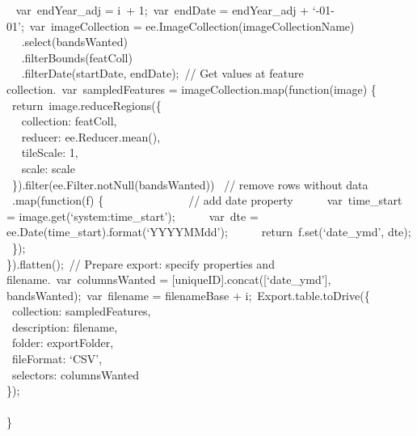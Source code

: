 \documentclass[
  letterpaper,
  DIV=11,
  numbers=noendperiod]{scrreprt}
\begin{document}
~ var~endYear\_adj = i~+ 1;~var~endDate = endYear\_adj +
`-01-01';~var~imageCollection =
ee.ImageCollection(imageCollectionName)\\
\hspace*{0.333em} ~ ~.select(bandsWanted)\\
\hspace*{0.333em} ~ ~.filterBounds(featColl)\\
\hspace*{0.333em} ~ ~.filterDate(startDate, endDate);~// Get values at
feature collection.~var~sampledFeatures =
imageCollection.map(function(image) \{~ ~return~image.reduceRegions(\{\\
\hspace*{0.333em} ~ ~collection: featColl,\\
\hspace*{0.333em} ~ ~reducer: ee.Reducer.mean(), ~ ~ ~ ~\\
\hspace*{0.333em} ~ ~tileScale: 1,\\
\hspace*{0.333em} ~ ~scale: scale\\
\hspace*{0.333em} ~\}).filter(ee.Filter.notNull(bandsWanted)) ~// remove
rows without data~ ~ ~.map(function(f) \{ ~ ~ ~ ~ ~ ~ ~ ~ ~// add date
property~ ~ ~ ~var~time\_start = image.get(`system:time\_start');~ ~ ~
~var~dte = ee.Date(time\_start).format(`YYYYMMdd');~ ~ ~
~return~f.set(`date\_ymd', dte);\\
\hspace*{0.333em} ~\});\\
\hspace*{0.333em}\}).flatten();~// Prepare export: specify properties
and filename.~var~columnsWanted =
{[}uniqueID{]}.concat({[}`date\_ymd'{]}, bandsWanted);~var~filename =
filenameBase + i;~Export.table.toDrive(\{\\
\hspace*{0.333em} ~collection: sampledFeatures,\\
\hspace*{0.333em} ~description: filename,\\
\hspace*{0.333em} ~folder: exportFolder,\\
\hspace*{0.333em} ~fileFormat: `CSV',\\
\hspace*{0.333em} ~selectors: columnsWanted\\
\hspace*{0.333em}\});\\
\hspace*{0.333em}\\
\}
\end{document}
